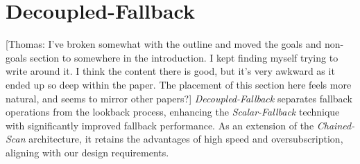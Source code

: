 \documentclass[sigconf]{acmart}
\newcommand{\thomas}[1]{{\footnotesize\color{orange}[Thomas: #1]}}
\begin{document}
\section{Decoupled-Fallback}
\thomas{I've broken somewhat with the outline and moved the goals and non-goals section to somewhere in the introduction. I kept finding myself trying to write around it. I think the content there is good, but it's very awkward as it ended up so deep within the paper. The placement of this section here feels more natural, and seems to mirror other papers?}
\emph{Decoupled-Fallback} separates fallback operations from the lookback process, enhancing the \emph{Scalar-Fallback} technique with significantly improved fallback performance. As an extension of the \emph{Chained-Scan} architecture, it retains the advantages of high speed and oversubscription, aligning with our design requirements.
\end{document}
